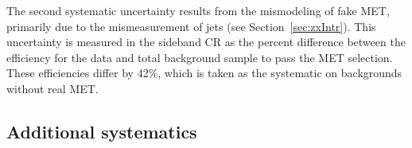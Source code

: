 
The second systematic uncertainty results from the mismodeling of fake MET, primarily due to the mismeasurement of jets (see Section~\ref{sec:zxIntr}). This uncertainty is measured in the sideband CR as the percent difference between the efficiency for the data and total background sample to pass the MET selection. These efficiencies differ by 42\%, which is taken as the systematic on backgrounds without real MET.

\subsection{Additional systematics}

